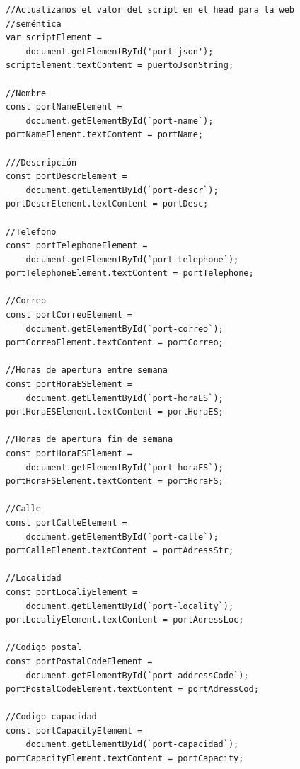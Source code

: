 \documentclass{article}
\begin{document}
\begin{itemize}
\begin{verbatim}
            //Actualizamos el valor del script en el head para la web 
            //seméntica
            var scriptElement = 
                document.getElementById('port-json');
            scriptElement.textContent = puertoJsonString;
        
            //Nombre
            const portNameElement = 
                document.getElementById(`port-name`);
            portNameElement.textContent = portName;
        
            ///Descripción
            const portDescrElement = 
                document.getElementById(`port-descr`);
            portDescrElement.textContent = portDesc;
        
            //Telefono
            const portTelephoneElement = 
                document.getElementById(`port-telephone`);
            portTelephoneElement.textContent = portTelephone;
        
            //Correo
            const portCorreoElement = 
                document.getElementById(`port-correo`);
            portCorreoElement.textContent = portCorreo;
        
            //Horas de apertura entre semana
            const portHoraESElement = 
                document.getElementById(`port-horaES`);
            portHoraESElement.textContent = portHoraES;
        
            //Horas de apertura fin de semana
            const portHoraFSElement = 
                document.getElementById(`port-horaFS`);
            portHoraFSElement.textContent = portHoraFS;
        
            //Calle
            const portCalleElement = 
                document.getElementById(`port-calle`);
            portCalleElement.textContent = portAdressStr;
        
            //Localidad
            const portLocaliyElement = 
                document.getElementById(`port-locality`);
            portLocaliyElement.textContent = portAdressLoc;
        
            //Codigo postal
            const portPostalCodeElement = 
                document.getElementById(`port-addressCode`);
            portPostalCodeElement.textContent = portAdressCod;
        
            //Codigo capacidad
            const portCapacityElement = 
                document.getElementById(`port-capacidad`);
            portCapacityElement.textContent = portCapacity;
        

\end{verbatim}
\end{itemize}
\end{document}
